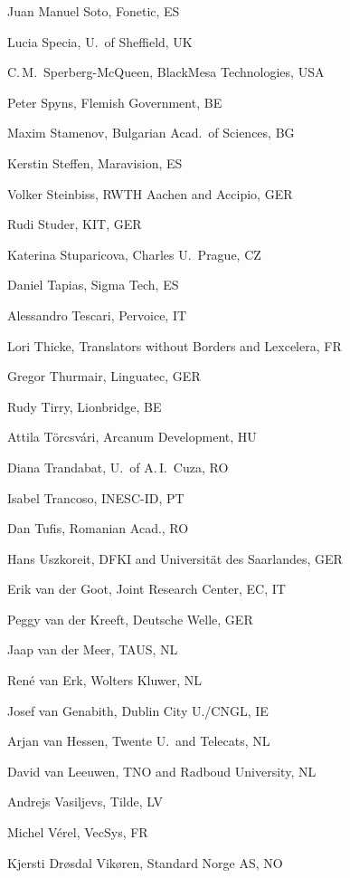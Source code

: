 \documentclass[10pt, plain]{../../metanetpaper}
\begin{document}
\begin{multicols}{3}
\begin{footnotesize}
\begin{enumerate}
{      \item Juan Manuel Soto, Fonetic, ES
      \item Lucia Specia, U.~of Sheffield, UK
      \item C.\,M.~Sperberg-McQueen, BlackMesa Technologies, USA
      \item Peter Spyns, Flemish Government, BE
      \item Maxim Stamenov, Bulgarian Acad.~of Sciences, BG
      \item Kerstin Steffen, Maravision, ES
      \item Volker Steinbiss, RWTH Aachen and Accipio, GER
      \item Rudi Studer, KIT, GER
      \item Katerina Stuparicova, Charles U.~Prague, CZ
      \item Daniel Tapias, Sigma Tech, ES
      \item Alessandro Tescari, Pervoice, IT
      \item Lori Thicke, Translators without Borders and Lexcelera, FR
      \item Gregor Thurmair, Linguatec, GER
      \item Rudy Tirry, Lionbridge, BE
      \item Attila Törcsvári, Arcanum Development, HU
      \item Diana Trandabat, U.~of A.\,I.~Cuza, RO
      \item Isabel Trancoso, INESC-ID, PT
      \item Dan Tufis, Romanian Acad., RO
      \item Hans Uszkoreit, DFKI and Universität des Saarlandes, GER
      \item Erik van der Goot, Joint Research Center, EC, IT
      \item Peggy van der Kreeft, Deutsche Welle, GER
      \item Jaap van der Meer, TAUS, NL
      \item René van Erk, Wolters Kluwer, NL
      \item Josef van Genabith, Dublin City U./CNGL, IE
      \item Arjan van Hessen, Twente U.~and Telecats, NL
      \item David van Leeuwen, TNO and Radboud University, NL
      \item Andrejs Vasiljevs, Tilde, LV
      \item Michel Vérel, VecSys, FR
      \item Kjersti Drøsdal Vikøren, Standard Norge AS, NO
}
\end{enumerate}
\end{footnotesize}
\end{multicols}
\end{document}
